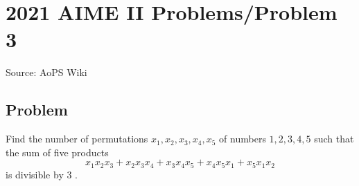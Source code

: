 \documentclass[12pt]{article}
\begin{document}
\section*{{2021 AIME II Problems/Problem 3}}
Source: AoPS Wiki

\subsection*{Problem}
Find the number of permutations $x_1, x_2, x_3, x_4, x_5$ of numbers $1, 2, 3, 4, 5$ such that the sum of five products \[x_1x_2x_3 + x_2x_3x_4 + x_3x_4x_5 + x_4x_5x_1 + x_5x_1x_2\] is divisible by $3$ .
\end{document}
